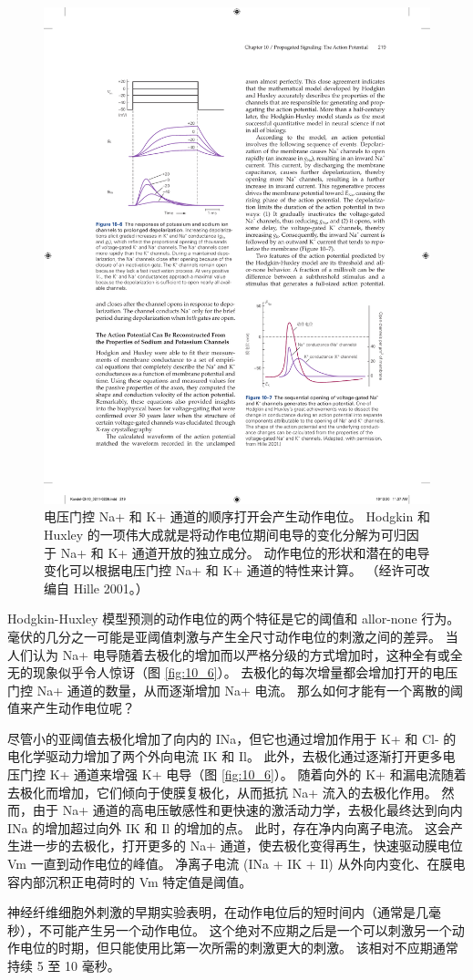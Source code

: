 \begin{figure}[htbp]
	\centering
	\includegraphics[width=0.5\linewidth]{chap10/fig_10_7}
	\caption{电压门控 Na+ 和 K+ 通道的顺序打开会产生动作电位。 Hodgkin 和 Huxley 的一项伟大成就是将动作电位期间电导的变化分解为可归因于 Na+ 和 K+ 通道开放的独立成分。 动作电位的形状和潜在的电导变化可以根据电压门控 Na+ 和 K+ 通道的特性来计算。 （经许可改编自 Hille 2001。）}
	\label{fig:10_7}
\end{figure}


Hodgkin-Huxley 模型预测的动作电位的两个特征是它的阈值和 allor-none 行为。 
毫伏的几分之一可能是亚阈值刺激与产生全尺寸动作电位的刺激之间的差异。 
当人们认为 Na+ 电导随着去极化的增加而以严格分级的方式增加时，这种全有或全无的现象似乎令人惊讶（图 \ref{fig:10_6}）。 
去极化的每次增量都会增加打开的电压门控 Na+ 通道的数量，从而逐渐增加 Na+ 电流。 
那么如何才能有一个离散的阈值来产生动作电位呢？


尽管小的亚阈值去极化增加了向内的 INa，但它也通过增加作用于 K+ 和 Cl- 的电化学驱动力增加了两个外向电流 IK 和 Il。 此外，去极化通过逐渐打开更多电压门控 K+ 通道来增强 K+ 电导（图 \ref{fig:10_6}）。 
随着向外的 K+ 和漏电流随着去极化而增加，它们倾向于使膜复极化，从而抵抗 Na+ 流入的去极化作用。 
然而，由于 Na+ 通道的高电压敏感性和更快速的激活动力学，去极化最终达到向内 INa 的增加超过向外 IK 和 Il 的增加的点。 
此时，存在净内向离子电流。 
这会产生进一步的去极化，打开更多的 Na+ 通道，使去极化变得再生，快速驱动膜电位 Vm 一直到动作电位的峰值。 
净离子电流 (INa + IK + Il) 从外向内变化、在膜电容内部沉积正电荷时的 Vm 特定值是阈值。


神经纤维细胞外刺激的早期实验表明，在动作电位后的短时间内（通常是几毫秒），不可能产生另一个动作电位。 
这个绝对不应期之后是一个可以刺激另一个动作电位的时期，但只能使用比第一次所需的刺激更大的刺激。 
该相对不应期通常持续 5 至 10 毫秒。


